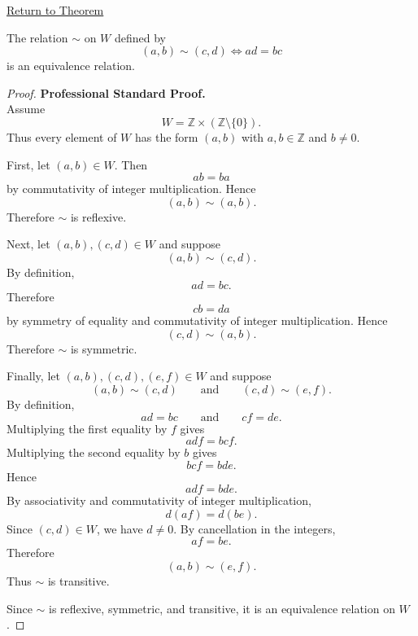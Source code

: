 \newpage
{}
\label{prf:fraction-pair-equivalence}

\begin{remark*}[Return]
\hyperref[thm:fraction-pair-equivalence]{Return to Theorem}
\end{remark*}

\begin{theorem*}
The relation $\sim$ on $W$ defined by
\[
(a,b)\sim(c,d)\iff ad=bc
\]
is an equivalence relation.
\end{theorem*}

\begin{proof}
\textbf{Professional Standard Proof.}~\\
Assume
\[
W=\mathbb{Z}\times(\mathbb{Z}\setminus\{0\}).
\]
Thus every element of $W$ has the form $(a,b)$ with $a,b\in\mathbb{Z}$
and $b\neq 0$.

First, let $(a,b)\in W$. Then
\[
ab=ba
\]
by commutativity of integer multiplication. Hence
\[
(a,b)\sim(a,b).
\]
Therefore $\sim$ is reflexive.

Next, let $(a,b),(c,d)\in W$ and suppose
\[
(a,b)\sim(c,d).
\]
By definition,
\[
ad=bc.
\]
Therefore
\[
cb=da
\]
by symmetry of equality and commutativity of integer multiplication. Hence
\[
(c,d)\sim(a,b).
\]
Therefore $\sim$ is symmetric.

Finally, let $(a,b),(c,d),(e,f)\in W$ and suppose
\[
(a,b)\sim(c,d)
\qquad\text{and}\qquad
(c,d)\sim(e,f).
\]
By definition,
\[
ad=bc
\qquad\text{and}\qquad
cf=de.
\]
Multiplying the first equality by $f$ gives
\[
adf=bcf.
\]
Multiplying the second equality by $b$ gives
\[
bcf=bde.
\]
Hence
\[
adf=bde.
\]
By associativity and commutativity of integer multiplication,
\[
d(af)=d(be).
\]
Since $(c,d)\in W$, we have $d\neq 0$. By cancellation in the integers,
\[
af=be.
\]
Therefore
\[
(a,b)\sim(e,f).
\]
Thus $\sim$ is transitive.

Since $\sim$ is reflexive, symmetric, and transitive, it is an equivalence
relation on $W$.
\end{proof}

